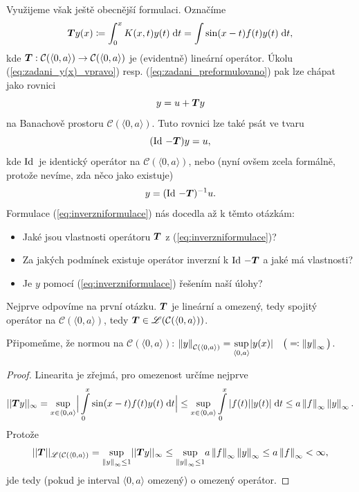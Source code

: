 Využijeme však ještě obecnější formulaci. Označíme
\begin{equation}
     \boldsymbol{T} y(x)\coloneqq \int_0^x K(x,t)y(t)\;\mathrm{d}t=\int\limits\sin(x-t)f(t)y(t)\;\mathrm{d}t,
    \label{eq:obesnejsiformulaceTy}
\end{equation}
kde $ \boldsymbol{T} : \mathcal{C}(\langle 0,a\rangle )\rightarrow \mathcal{C}(\langle 0,a\rangle )$ je (evidentně) lineární operátor. Úkolu (\ref{eq:zadani_y(x)_vpravo}) resp. (\ref{eq:zadani_preformulovano}) pak lze chápat jako rovnici
\begin{equation}
    y=u+ \boldsymbol{T} y
\end{equation}
na Banachově prostoru $\mathcal{C}(\langle 0,a\rangle)$. Tuto rovnici lze také psát ve tvaru
\begin{equation}
    (\operatorname{Id}\,- \boldsymbol{T} )y=u,
\end{equation}
kde $\operatorname{Id}\,$ je identický operátor na $\mathcal{C}(\langle 0,a\rangle)$, nebo (nyní ovšem zcela formálně, protože nevíme, zda něco jako  existuje)
\begin{equation}
    y = (\operatorname{Id}\,- \boldsymbol{T} )^{-1}u.
    \label{eq:inverzniformulace}
\end{equation}
Formulace (\ref{eq:inverzniformulace}) nás docedla až k těmto otázkám:
\begin{itemize}
    \item Jaké jsou vlastnosti operátoru $ \boldsymbol{T} $ z (\ref{eq:inverzniformulace})?
    \item Za jakých podmínek existuje operátor inverzní k $\operatorname{Id}\,- \boldsymbol{T} $ a jaké má vlastnosti?
    \item Je $y$  pomocí (\ref{eq:inverzniformulace}) řešením naší úlohy?
\end{itemize}
Nejprve odpovíme na první otázku. $ \boldsymbol{T} $ je lineární a omezený, tedy spojitý operátor na $\mathcal{C}(\langle0,a\rangle)$, tedy $ \boldsymbol{T} \in\mathscr{L}(\mathcal{C}(\langle0,a\rangle))$.

Připomeňme, že normou na $\mathcal{C}(\langle0,a\rangle)$: $\left\lVert y\right\rVert_{\mathcal{C}(\langle0,a\rangle)} = \underset{\langle 0,a\rangle}{\sup} |y(x)| \quad \big(\eqqcolon \left\lVert y\right\rVert_\infty\big)$.

\begin{proof}
Linearita je zřejmá, pro omezenost určíme nejprve
\begin{equation}
    || \boldsymbol{T} y||_\infty = \underset{x\in\langle0,a\rangle}{\sup}\Big|\int\limits_0^x\sin(x-t)f(t)y(t)\;\mathrm{d}t\Big|\leq \underset{x\in\langle0,a\rangle}{\sup}\int\limits_0^x|f(t)||y(t)|\;\mathrm{d}t\leq a\left\lVert f\right\rVert_\infty\left\lVert y\right\rVert_\infty.
\end{equation}
Protože  
\begin{equation}
    || \boldsymbol{T} ||_{\mathscr{L}(\mathcal{C}(\langle0,a\rangle)} = \underset{\left\lVert y\right\rVert_\infty\leq1}{\sup}|| \boldsymbol{T} y||_\infty\leq \underset{\left\lVert y\right\rVert_\infty\leq1}{\sup} a \left\lVert f\right\rVert_\infty \left\lVert y\right\rVert_\infty\leq a \left\lVert f\right\rVert_\infty<\infty,
    \label{eq:omezeniOperatoru}
\end{equation}
jde tedy (pokud je interval $\langle0,a\rangle$ omezený) o omezený operátor.
\end{proof}

